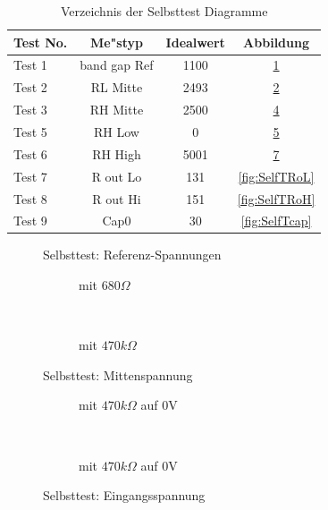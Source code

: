 \begin{table}[H]
  \begin{center}
    \begin{tabular}{| l | c | c | c |}
    \hline
Test No. &  Me"styp    & Idealwert & Abbildung \\
    \hline
    \hline
Test 1 & band gap Ref  & 1100 & \ref{fig:SelfTref} \\
    \hline
Test 2 & RL Mitte & 2493 & \ref{fig:SelfTMitL} \\
    \hline
Test 3 & RH Mitte & 2500 & \ref{fig:SelfTMitH} \\
    \hline
Test 5 & RH Low &  0 & \ref{fig:SelfTlowH} \\
    \hline
Test 6 & RH High & 5001 & \ref{fig:SelfTtopH} \\
    \hline
Test 7 & R out Lo & 131 & \ref{fig:SelfTRoL} \\
    \hline
Test 8 & R out Hi & 151 & \ref{fig:SelfTRoH} \\
    \hline
Test 9 & Cap0  & 30 & \ref{fig:SelfTcap} \\
    \hline
    \end{tabular}
  \end{center}
  \caption{Verzeichnis der Selbsttest Diagramme}
  \label{tab:test_m168} 
\end{table}

\begin{figure}[H]
\centering

\caption{Selbsttest: Referenz-Spannungen}
\label{fig:SelfTref}
\end{figure}

\begin{figure}[H]
  \begin{subfigure}[b]{9cm}
    \centering
    \resizebox{9cm}{!}{}
    \caption{mit \(680 \Omega\)}
    \label{fig:SelfTMitL}
  \end{subfigure}
  ~
  \begin{subfigure}[b]{9cm}
    \centering
    \resizebox{9cm}{!}{}
    \caption{mit \(470 k\Omega\)}
    \label{fig:SelfTMitH}
  \end{subfigure}
  \caption{Selbsttest: Mittenspannung}
\end{figure}

\begin{figure}[H]
  \begin{subfigure}[b]{9cm}
  \centering
    \resizebox{9cm}{!}{}
    \caption{mit \(470 k\Omega\) auf 0V}
    \label{fig:SelfTlowH}
  \end{subfigure}
  ~
  \begin{subfigure}[b]{9cm}
  \centering
    \resizebox{9cm}{!}{}
    \caption{mit \(470 k\Omega\) auf 0V}
    \label{fig:SelfTtopH}
  \end{subfigure}
  \caption{Selbsttest: Eingangsspannung}
\end{figure}

